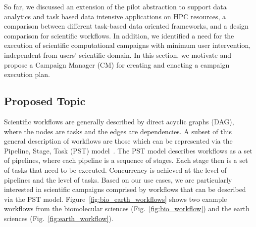 \label{research}
So far, we discussed an extension of the pilot abstraction to support data analytics and task based data intensive applications on HPC resources, a comparison between different task-based data oriented frameworks, and a design comparison for scientific workflows.
In addition, we identified a need for the execution of scientific computational campaigns with minimum user intervention, independent from users' scientific domain.
In this section, we motivate and propose a Campaign Manager (CM) for creating and enacting a campaign execution plan. 


\subsection{Proposed Topic}

Scientific workflows are generally described by direct acyclic graphs (DAG), where the nodes are tasks and the edges are dependencies.
A subset of this general description of workflows are those which can be represented via the Pipeline, Stage, Task (PST) model~\cite{balasubramanian2018harnessing}. 
The PST model describes workflows as a set of pipelines, where each pipeline is a sequence of stages.
Each stage then is a set of tasks that need to be executed.
Concurrency is achieved at the level of pipelines and the level of tasks. 
Based on our use cases, we are particularly interested in scientific campaigns comprised by workflows that can be described via the PST model. 
Figure~\ref{fig:bio_earth_workflows} shows two example workflows from the biomolecular sciences (Fig.~\ref{fig:bio_workflow}) and the earth sciences (Fig.~\ref{fig:earth_workflow}). 

